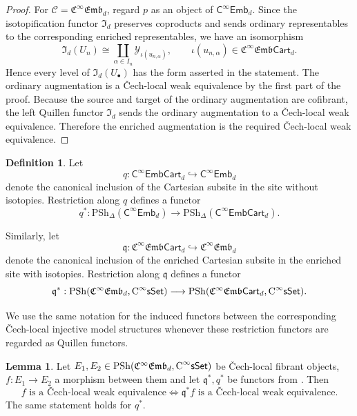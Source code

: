 \documentclass{amsart}
\newcommand{\cat}[1]{\mathsf{#1}}
\newcommand{\sset}{\cat{sSet}}
\newcommand{\CsSet}{\textnormal{C}^{\infty}\sset}
\newcommand{\fembnoniso}[1]{\cat{C}^{\infty}\cat{Emb}_{#1}}
\newcommand{\fembcartnoniso}[1]{\cat{C}^{\infty}\cat{EmbCart}_{#1}}
\newcommand{\femb}[1]{\mathfrak{C}^{\infty}\mathfrak{Emb}_{#1}}
\newcommand{\fembcart}[1]{\mathfrak{C}^{\infty}\mathfrak{Emb}\cat{Cart}_{#1}}
\newcommand{\psh}{\mathrm{PSh}}
\newcommand{\spsh}{\mathrm{PSh}_{\Delta}}
\newcommand{\Yo}{\mathscr{Y}}
\theoremstyle{definition}
\newtheorem{definition}[equation]{Definition}
\newtheorem{lemma}[equation]{Lemma}
\numberwithin{equation}{subsection}
\numberwithin{subsubsection}{subsection}
\begin{document}
\begin{proof}
  For \(\mathcal{C}=\femb{d}\), regard \(p\) as an object of
  \(\fembnoniso{d}\). Since the isotopification functor
  \(\mathfrak{I}_d\) preserves coproducts and sends ordinary representables to
  the corresponding enriched representables, we have an isomorphism
  \[
    \mathfrak{I}_d (U_n)
    \cong
    \coprod_{\alpha\in I_n}\Yo_{\iota(u_{n,\alpha})},
    \qquad
    \iota(u_{n,\alpha})\in\fembcart{d}.
  \]
  Hence every level of \(\mathfrak{I}_d(U_\bullet)\) has the form asserted in
  the statement. The ordinary augmentation is a \v{C}ech-local weak equivalence
  by the
  first part of the proof. Because the source and target of the ordinary
  augmentation are cofibrant, the left Quillen functor \(\mathfrak{I}_d\)
  sends the ordinary augmentation to a \v{C}ech-local weak equivalence.
  Therefore the enriched augmentation is the required
  \v{C}ech-local weak equivalence.
\end{proof}

\begin{definition}\label{def:Cartesian.subsite.restriction.functors}
  Let
  \[
    q:\fembcartnoniso{d}\hookrightarrow\fembnoniso{d}
  \]
  denote the canonical inclusion of the Cartesian subsite in the site without
  isotopies. Restriction along \(q\) defines a functor
  \[
    q^{*}:
    \spsh(\fembnoniso{d})
    \longrightarrow
    \spsh(\fembcartnoniso{d}).
  \]

  Similarly, let
  \[
    \mathfrak{q}:\fembcart{d}\hookrightarrow\femb{d}
  \]
  denote the canonical inclusion of the enriched Cartesian subsite in the
  enriched site with isotopies. Restriction along \(\mathfrak{q}\) defines
  a functor
  \[
    \mathfrak{q}^{*}:
    \psh(\femb{d},\CsSet)
    \longrightarrow
    \psh(\fembcart{d},\CsSet).
  \]

  We use the same notation for the induced functors between the corresponding
  \v{C}ech-local injective model structures whenever these restriction
  functors are regarded as Quillen functors.
\end{definition}

\begin{lemma}\label{lem:qen.comparison.on.cech.local}
  Let \(E_{1},E_{2}\in\psh(\femb{d},\CsSet)\) be \v{C}ech-local fibrant
  objects, \(f:E_{1}\to E_{2}\) a morphism between them and let
  \(\mathfrak{q}^{*}, q^{*}\) be functors from
  . Then
  \[
    f \text{ is a \v{C}ech-local weak equivalence}
    \Longleftrightarrow
    \mathfrak{q}^{*}f \text{ is a \v{C}ech-local weak equivalence}.
  \]
  The same statement holds for \(q^{*}\).
\end{lemma}
\end{document}
